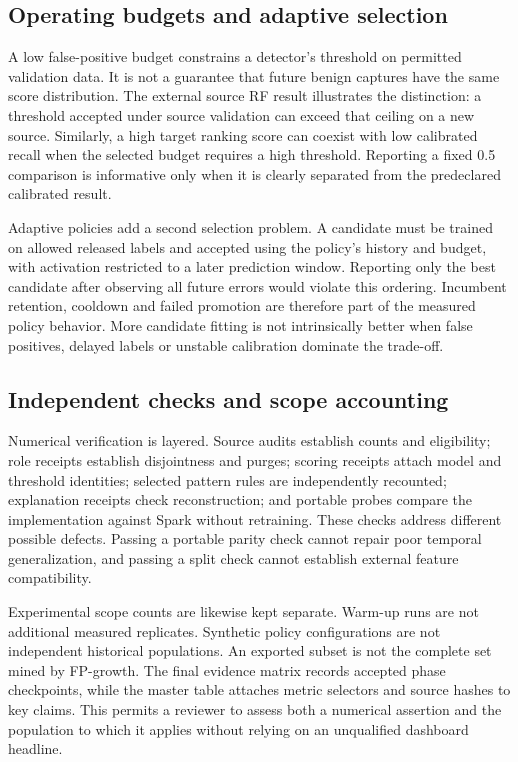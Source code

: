 \documentclass[conference]{IEEEtran}
\begin{document}
\subsection{Operating budgets and adaptive selection}
A low false-positive budget constrains a detector's threshold on permitted validation data. It is not a guarantee that future benign captures have the same score distribution. The external source RF result illustrates the distinction: a threshold accepted under source validation can exceed that ceiling on a new source. Similarly, a high target ranking score can coexist with low calibrated recall when the selected budget requires a high threshold. Reporting a fixed 0.5 comparison is informative only when it is clearly separated from the predeclared calibrated result.

Adaptive policies add a second selection problem. A candidate must be trained on allowed released labels and accepted using the policy's history and budget, with activation restricted to a later prediction window. Reporting only the best candidate after observing all future errors would violate this ordering. Incumbent retention, cooldown and failed promotion are therefore part of the measured policy behavior. More candidate fitting is not intrinsically better when false positives, delayed labels or unstable calibration dominate the trade-off.

\subsection{Independent checks and scope accounting}
Numerical verification is layered. Source audits establish counts and eligibility; role receipts establish disjointness and purges; scoring receipts attach model and threshold identities; selected pattern rules are independently recounted; explanation receipts check reconstruction; and portable probes compare the implementation against Spark without retraining. These checks address different possible defects. Passing a portable parity check cannot repair poor temporal generalization, and passing a split check cannot establish external feature compatibility.

Experimental scope counts are likewise kept separate. Warm-up runs are not additional measured replicates. Synthetic policy configurations are not independent historical populations. An exported subset is not the complete set mined by FP-growth. The final evidence matrix records accepted phase checkpoints, while the master table attaches metric selectors and source hashes to key claims. This permits a reviewer to assess both a numerical assertion and the population to which it applies without relying on an unqualified dashboard headline.
\end{document}
